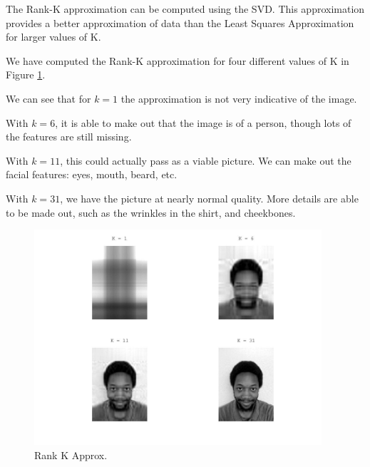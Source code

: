 \documentclass[12pt,letterpaper]{article}
\begin{document}
\begin{enumerate}
      \pagebreak

      The Rank-K approximation can be computed using the SVD.
      This approximation provides a better approximation of data than the Least Squares Approximation for larger values of K.

      We have computed the Rank-K approximation for four different values of K in Figure \ref{fig:rank_k}.

      We can see that for $k = 1$ the approximation is not very indicative of the image.

      With $k = 6$, it is able to make out that the image is of a person, though lots of the features are still missing.

      With $k = 11$, this could actually pass as a viable picture.
      We can make out the facial features: eyes, mouth, beard, etc.

      With $k = 31$, we have the picture at nearly normal quality.
      More details are able to be made out,
      such as the wrinkles in the shirt, and cheekbones.

      \begin{figure}[h]
        \centering
        \includegraphics[width=0.95\textwidth]{rank_k.jpg}
        \caption{Rank K Approx.}
        \label{fig:rank_k}
      \end{figure}

  \end{enumerate}
\end{document}
